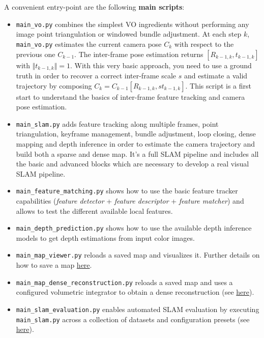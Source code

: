 \documentclass{article}
\begin{document}
A convenient entry-point are the following \textbf{main scripts}:
\begin{itemize}
\item 
\texttt{main\_vo.py} combines the simplest VO
ingredients without performing any image point triangulation or windowed
bundle adjustment. At each step \(k\), \texttt{main\_vo.py} estimates
the current camera pose \(C_k\) with respect to the previous one
\(C_{k-1}\). The inter-frame pose estimation returns
\([R_{k-1,k},t_{k-1,k}]\) with \(\Vert t_{k-1,k} \Vert=1\). With this
very basic approach, you need to use a ground truth in order to recover
a correct inter-frame scale \(s\) and estimate a valid trajectory by
composing \(C_k = C_{k-1} [R_{k-1,k}, s t_{k-1,k}]\). This script is a
first start to understand the basics of inter-frame feature tracking and
camera pose estimation.
\item
  \texttt{main\_slam.py} adds feature tracking along multiple frames,
  point triangulation, keyframe management, bundle adjustment, loop
  closing, dense mapping and depth inference in order to estimate the
  camera trajectory and build both a sparse and dense map. It's a full
  SLAM pipeline and includes all the basic and advanced blocks which are
  necessary to develop a real visual SLAM pipeline.
\item
  \texttt{main\_feature\_matching.py} shows how to use the basic feature
  tracker capabilities (\emph{feature detector} + \emph{feature
  descriptor} + \emph{feature matcher}) and allows to test the different
  available local features.
\item
  \texttt{main\_depth\_prediction.py} shows how to use the available
  depth inference models to get depth estimations from input color
  images.
\item
  \texttt{main\_map\_viewer.py} reloads a saved map and visualizes it.
  Further details on how to save a map
  \protect\hyperlink{reload-a-saved-map-and-relocalize-in-it}{here}.
\item
  \texttt{main\_map\_dense\_reconstruction.py} reloads a saved map and
  uses a configured volumetric integrator to obtain a dense
  reconstruction (see
  \protect\hyperlink{volumetric-reconstruction}{here}).
  \item
  \texttt{main\_slam\_evaluation.py} enables automated SLAM evaluation
  by executing \texttt{main\_slam.py} across a collection of datasets
  and configuration presets (see
  \protect\hyperlink{evaluating-slam}{here}).
\end{itemize}
\end{document}
